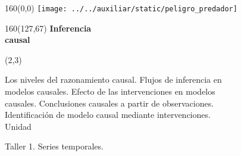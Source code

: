 \documentclass[shownotes,aspectratio=169]{beamer}
\newcounter{capitulo}
\newcommand{\unidad}{\thecapitulo \stepcounter{capitulo}}
\begin{document}
\begin{frame}

\begin{textblock}{160}(0,0)
\texttt{[image: ../../auxiliar/static/peligro\_predador]}
\end{textblock}

\begin{textblock}{160}(127,67)
\LARGE \textcolor{black!5}{\fontsize{22}{0}\selectfont \textbf{Inferencia  \\[-0.1cm] \hspace{0.5cm} causal}}
\end{textblock}

\begin{textblock}{55}(2,3)
\begin{turn}{0}
\parbox{15cm}{\small
\textcolor{black!95}{Los niveles del razonamiento causal. Flujos de inferencia en}\\
\textcolor{black!95}{modelos causales. Efecto de las intervenciones en modelos} \\
\textcolor{black!95}{causales. Conclusiones causales a partir de observaciones.} \\
\textcolor{black!95}{Identificación de modelo causal mediante intervenciones.} \\
\normalsize\textcolor{black!95}{Unidad \unidad} \\
}
\end{turn}
\end{textblock}

\end{frame}



\begin{frame}

\centering \LARGE
Taller 1. Series temporales.

\end{frame}
\end{document}
